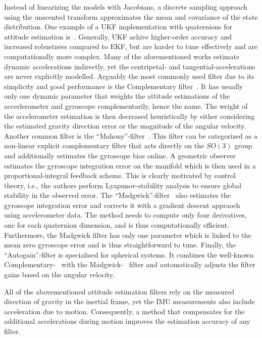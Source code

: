 \documentclass[journal]{IEEEtran}
\begin{document}
Instead of linearizing the models with Jacobians, a discrete sampling approach using the unscented transform approximates the mean and covariance of the state distribution.
One example of a UKF implementation with quaternions for attitude estimation is~\cite{1257247}.
Generally, UKF achive higher-order accuracy and increased robustness compared to EKF, but are harder to tune effectively and are computationally more complex.
Many of the aforementioned works estimate dynamic accelerations indirectly, yet the centripetal- and tangential-accelerations are never explicitly modelled. 
Arguably the most commonly used filter due to its simplicity and good performance is the Complementary filter~\cite{complementary}.
It has usually only one dynamic parameter that weights the attitude estimations of the accerlerometer and gyroscope complementarily, hence the name.
The weight of the accelerometer estimation is then decreased heuristically by either considering the estimated gravity direction error or the magnitude of the angular velocity. 
Another common filter is the ``Mahony''-filter~\cite{mahony}.
This filter can be categorized as a non-linear explicit complementary filter that acts directly on the $SO(3)$ group and additionally estimates the gyroscope bias online.
A geometric observer estimates the gyroscope integration error on the manifold which is then used in a proportional-integral feedback scheme.
This is clearly motivated by control theory, i.e., the authors perform Lyapunov-stability analysis to ensure global stability in the observed error.  
The ``Madgwick''-filter~\cite{madgwick} also estimates the gyroscope integration error and corrects it with a gradient descent appraoch using accelerometer data.
The method needs to compute only four derivatives, one for each quaternion dimension, and is thus computationally efficient.
Furthermore, the Madgwick filter has only one parameter which is linked to the mean zero gyroscope error and is thus straightforward to tune.
Finally, the ``Autogain''-filter
is specialized for spherical systems.
It combines the well-known Complementary-~\cite{complementary} with the Madgwick-~\cite{madgwick} filter and automatically adjusts the filter gains based on the angular velocity. 

All of the abovementioned attitude estimation filters rely on the measured direction of gravity in the inertial frame, yet the IMU measurements also include acceleration due to motion. 
Consequently, a method that compensates for the additional accelerations during motion improves the estimation accuracy of any filter. 
\end{document}
